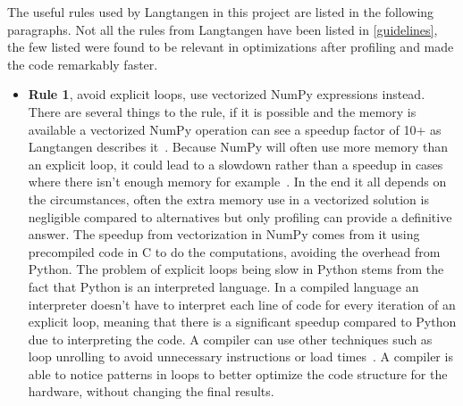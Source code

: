 \documentclass[12pt, a4paper]{article}
\begin{document}
The useful rules used by Langtangen in this project are listed in the following paragraphs.
Not all the rules from Langtangen have been listed in \ref{guidelines}, the few listed were found to be relevant in optimizations after profiling and made the code remarkably faster.
\begin{itemize}\label{guidelines}
    \item \textbf{Rule 1}, avoid explicit loops, use vectorized NumPy expressions instead.
    There are several things to the rule, if it is possible and the memory is available a vectorized NumPy operation can see a speedup factor of 10+ as Langtangen describes it~\cite{NumpyArray}.
    Because NumPy will often use more memory than an explicit loop, it could lead to a slowdown rather than a speedup in cases where there isn't enough memory for example~\cite{NumpyVectorization}.
    In the end it all depends on the circumstances, often the extra memory use in a vectorized solution is negligible compared to alternatives but only profiling can provide a definitive answer.
    The speedup from vectorization in NumPy comes from it using precompiled code in C to do the computations, avoiding the overhead from Python.
    The problem of explicit loops being slow in Python stems from the fact that Python is an interpreted language.
    In a compiled language an interpreter doesn't have to interpret each line of code for every iteration of an explicit loop, meaning that there is a significant speedup compared to Python due to interpreting the code.
    A compiler can use other techniques such as loop unrolling to avoid unnecessary instructions or load times~\cite{wiki:LoopUnroll}.
    A compiler is able to notice patterns in loops to better optimize the code structure for the hardware, without changing the final results.


\end{itemize}
\end{document}
